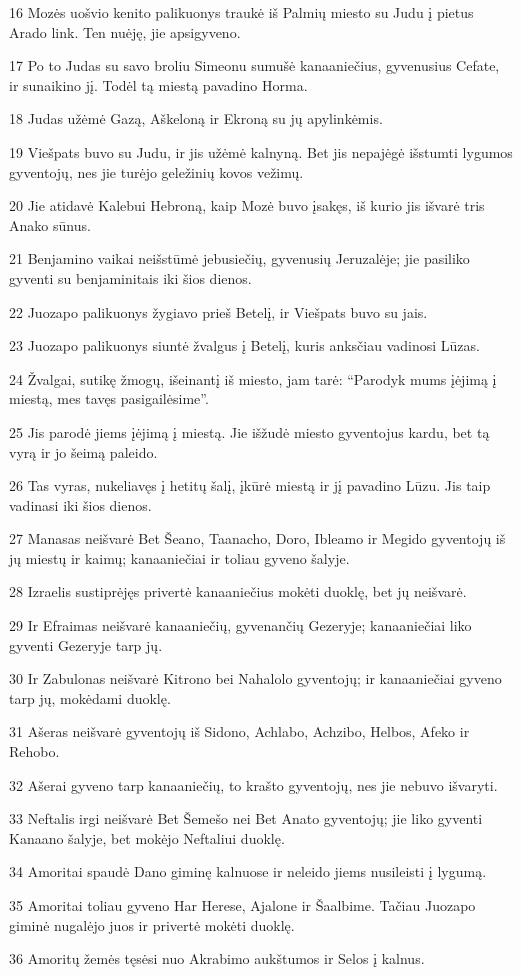 \par 16 Mozės uošvio kenito palikuonys traukė iš Palmių miesto su Judu į pietus Arado link. Ten nuėję, jie apsigyveno. 
\par 17 Po to Judas su savo broliu Simeonu sumušė kanaaniečius, gyvenusius Cefate, ir sunaikino jį. Todėl tą miestą pavadino Horma. 
\par 18 Judas užėmė Gazą, Aškeloną ir Ekroną su jų apylinkėmis. 
\par 19 Viešpats buvo su Judu, ir jis užėmė kalnyną. Bet jis nepajėgė išstumti lygumos gyventojų, nes jie turėjo geležinių kovos vežimų. 
\par 20 Jie atidavė Kalebui Hebroną, kaip Mozė buvo įsakęs, iš kurio jis išvarė tris Anako sūnus. 
\par 21 Benjamino vaikai neišstūmė jebusiečių, gyvenusių Jeruzalėje; jie pasiliko gyventi su benjaminitais iki šios dienos. 
\par 22 Juozapo palikuonys žygiavo prieš Betelį, ir Viešpats buvo su jais. 
\par 23 Juozapo palikuonys siuntė žvalgus į Betelį, kuris anksčiau vadinosi Lūzas. 
\par 24 Žvalgai, sutikę žmogų, išeinantį iš miesto, jam tarė: “Parodyk mums įėjimą į miestą, mes tavęs pasigailėsime”. 
\par 25 Jis parodė jiems įėjimą į miestą. Jie išžudė miesto gyventojus kardu, bet tą vyrą ir jo šeimą paleido. 
\par 26 Tas vyras, nukeliavęs į hetitų šalį, įkūrė miestą ir jį pavadino Lūzu. Jis taip vadinasi iki šios dienos. 
\par 27 Manasas neišvarė Bet Šeano, Taanacho, Doro, Ibleamo ir Megido gyventojų iš jų miestų ir kaimų; kanaaniečiai ir toliau gyveno šalyje. 
\par 28 Izraelis sustiprėjęs privertė kanaaniečius mokėti duoklę, bet jų neišvarė. 
\par 29 Ir Efraimas neišvarė kanaaniečių, gyvenančių Gezeryje; kanaaniečiai liko gyventi Gezeryje tarp jų. 
\par 30 Ir Zabulonas neišvarė Kitrono bei Nahalolo gyventojų; ir kanaaniečiai gyveno tarp jų, mokėdami duoklę. 
\par 31 Ašeras neišvarė gyventojų iš Sidono, Achlabo, Achzibo, Helbos, Afeko ir Rehobo. 
\par 32 Ašerai gyveno tarp kanaaniečių, to krašto gyventojų, nes jie nebuvo išvaryti. 
\par 33 Neftalis irgi neišvarė Bet Šemešo nei Bet Anato gyventojų; jie liko gyventi Kanaano šalyje, bet mokėjo Neftaliui duoklę. 
\par 34 Amoritai spaudė Dano giminę kalnuose ir neleido jiems nusileisti į lygumą. 
\par 35 Amoritai toliau gyveno Har Herese, Ajalone ir Šaalbime. Tačiau Juozapo giminė nugalėjo juos ir privertė mokėti duoklę. 
\par 36 Amoritų žemės tęsėsi nuo Akrabimo aukštumos ir Selos į kalnus.


